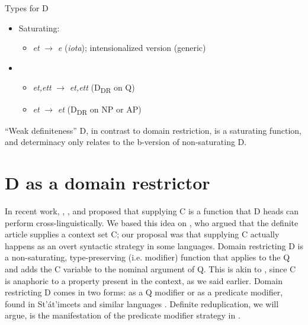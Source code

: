 \documentclass[output=paper,
modfonts
]{langscibook}
\begin{document}
\ea\label{ex:etxeberria:15}
{Types for D}
\begin{itemize}
	\item {Saturating:} 
	\begin{itemize}
		\item \textit{et} $\rightarrow$ \textit{e} (\textit{iota}); intensionalized version (generic)
	\end{itemize} 
	\item {}
	\begin{itemize}
		\item \textit{et,ett} $\rightarrow$ \textit{et,ett} (D\textsubscript{DR} on Q)
		\item \textit{et} $\rightarrow$ \textit{et} (D\textsubscript{DR} on NP or AP)
	\end{itemize}
\end{itemize}
\z

``Weak definiteness'' D, in contrast to domain restriction, is a saturating function, and determinacy \citep{CoppockBeaver2015} only relates to the b-version of non-saturating D. 

\section{D as a domain restrictor} \label{sec:etxeberria:2}

In recent work, \citet{Giannakidou2004}, \citet{etxeberria2005}, and \citet{etxeberria-giannakidou2009, etxeberria-giannakidou2014} proposed that supplying C is a function that D heads can perform cross-linguistically. We based this idea on \citet{Westerstahl1984, Westerstaahl1985}, who argued that the definite article supplies a context set C; our proposal was that supplying C actually happens as an overt syntactic strategy in some languages. Domain restricting D is a non-saturating, type-preserving (i.e. modifier) function that applies to the Q and adds the C variable to the nominal argument of Q. This is akin to , since C is anaphoric to a property present in the context, as we said earlier. Domain restricting D comes in two forms: as a Q modifier or as a predicate modifier, found in St'\'at'imcets and similar languages \citep{matthewson2001, gillon2006, gillon2009}. Definite reduplication, we will argue, is the manifestation of the predicate modifier strategy in . 
\end{document}
